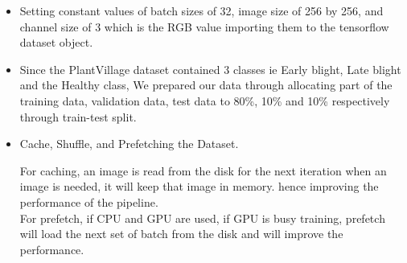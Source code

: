 \documentclass[11pt]{report}
\begin{document}
\begin{itemize}
	\item Setting constant values of batch sizes of 32, image size of 256 by 256, and channel size of 3 which is the RGB value importing them to the tensorflow dataset object.\\
	\item Since the PlantVillage dataset contained 3 classes ie Early blight, Late blight and the Healthy class, We prepared our data through allocating part of the training data, validation data, test data to 80\%, 10\% and 10\% respectively through train-test split.\\ 
	\item Cache, Shuffle, and Prefetching the Dataset. 
	
	For caching, an image is read from the disk for the next iteration when an image is needed, it will keep that image in memory. hence improving the performance of the pipeline.\\
	
	For prefetch, if CPU and GPU are used, if GPU is busy training, prefetch will load the next set of batch from the disk and will improve the performance.\\
	
	
\end{itemize}
\end{document}
